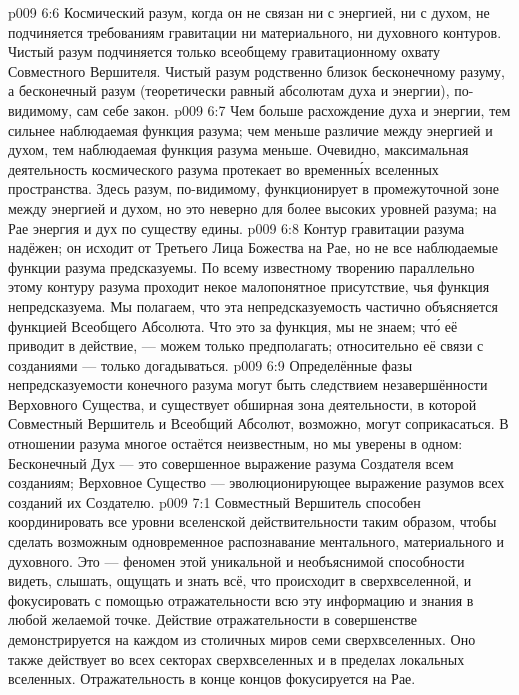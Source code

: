 \vs p009 6:6 \pc Космический разум, когда он не связан ни с энергией, ни с духом, не подчиняется требованиям гравитации ни материального, ни духовного контуров. Чистый разум подчиняется только всеобщему гравитационному охвату Совместного Вершителя. Чистый разум родственно близок бесконечному разуму, а бесконечный разум (теоретически равный абсолютам духа и энергии), по\hyp{}видимому, сам себе закон.
\vs p009 6:7 Чем больше расхождение духа и энергии, тем сильнее наблюдаемая функция разума; чем меньше различие между энергией и духом, тем наблюдаемая функция разума меньше. Очевидно, максимальная деятельность космического разума протекает во временн\'ых вселенных пространства. Здесь разум, по\hyp{}видимому, функционирует в промежуточной зоне между энергией и духом, но это неверно для более высоких уровней разума; на Рае энергия и дух по существу едины.
\vs p009 6:8 \pc Контур гравитации разума надёжен; он исходит от Третьего Лица Божества на Рае, но не все наблюдаемые функции разума предсказуемы. По всему известному творению параллельно этому контуру разума проходит некое малопонятное присутствие, чья функция непредсказуема. Мы полагаем, что эта непредсказуемость частично объясняется функцией Всеобщего Абсолюта. Что это за функция, мы не знаем; чт\'о её приводит в действие, --- можем только предполагать; относительно её связи с созданиями --- только догадываться.
\vs p009 6:9 \pc Определённые фазы непредсказуемости конечного разума могут быть следствием незавершённости Верховного Существа, и существует обширная зона деятельности, в которой Совместный Вершитель и Всеобщий Абсолют, возможно, могут соприкасаться. В отношении разума многое остаётся неизвестным, но мы уверены в одном: Бесконечный Дух --- это совершенное выражение разума Создателя всем созданиям; Верховное Существо --- эволюционирующее выражение разумов всех созданий их Создателю.
\vs p009 7:1 Совместный Вершитель способен координировать все уровни вселенской действительности таким образом, чтобы сделать возможным одновременное распознавание ментального, материального и духовного. Это --- феномен  этой уникальной и необъяснимой способности видеть, слышать, ощущать и знать всё, что происходит в сверхвселенной, и фокусировать с помощью отражательности всю эту информацию и знания в любой желаемой точке. Действие отражательности в совершенстве демонстрируется на каждом из столичных миров семи сверхвселенных. Оно также действует во всех секторах сверхвселенных и в пределах локальных вселенных. Отражательность в конце концов фокусируется на Рае.
